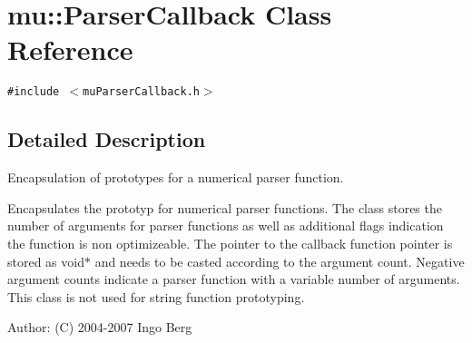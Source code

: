 \section{mu::ParserCallback Class Reference}
\label{classmu_1_1ParserCallback}
{\tt \#include $<$muParserCallback.h$>$}



\subsection{Detailed Description}
Encapsulation of prototypes for a numerical parser function. 

Encapsulates the prototyp for numerical parser functions. The class stores the number of arguments for parser functions as well as additional flags indication the function is non optimizeable. The pointer to the callback function pointer is stored as void$\ast$ and needs to be casted according to the argument count. Negative argument counts indicate a parser function with a variable number of arguments. This class is not used for string function prototyping.

\begin{Desc}
\item[Author:](C) 2004-2007 Ingo Berg \end{Desc}
